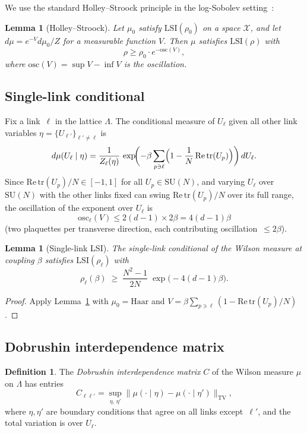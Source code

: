 \documentclass[11pt]{article}
\newtheorem{lemma}[theorem]{Lemma}
\theoremstyle{definition}
\newtheorem{definition}[theorem]{Definition}
\theoremstyle{remark}
\newcommand{\SU}{\mathrm{SU}}
\newcommand{\tr}{\mathrm{tr}}
\newcommand{\osc}{\mathrm{osc}}
\newcommand{\LSI}{\mathrm{LSI}}
\newcommand{\TV}{\mathrm{TV}}
\newcommand{\Haar}{\mathrm{Haar}}
\begin{document}
We use the standard Holley--Stroock principle in the log-Sobolev 
setting~\cite[Prop.~5.1.6]{BGL}:

\begin{lemma}[Holley--Stroock]\label{lem:HS}
Let $\mu_0$ satisfy $\LSI(\rho_0)$ on a space $\mathcal{X}$, and 
let $d\mu = e^{-V} d\mu_0 / Z$ for a measurable function $V$.  Then 
$\mu$ satisfies $\LSI(\rho)$ with
\[
  \rho \geq \rho_0 \cdot e^{-\osc(V)},
\]
where $\osc(V) = \sup V - \inf V$ is the oscillation.
\end{lemma}

\subsection{Single-link conditional}

Fix a link~$\ell$ in the lattice $\Lambda$.  The conditional 
measure of $U_\ell$ given all other link variables 
$\eta = \{U_{\ell'}\}_{\ell' \neq \ell}$ is
\[
  d\mu(U_\ell \mid \eta) = 
  \frac{1}{Z_\ell(\eta)}\,
  \exp\!\biggl(-\beta \sum_{p \ni \ell}
  \Bigl(1 - \frac{1}{N}\,\mathrm{Re}\,\tr(U_p)\Bigr)\biggr)
  \,dU_\ell.
\]
Since $\mathrm{Re}\,\tr(U_p)/N \in [-1, 1]$ for all 
$U_p \in \SU(N)$, and varying $U_\ell$ over $\SU(N)$ with the 
other links fixed can swing $\mathrm{Re}\,\tr(U_p)/N$ over its 
full range, the oscillation of the exponent over $U_\ell$ is
\[
  \osc_\ell(V) \leq 2(d-1) \times 2\beta = 4(d-1)\beta
\]
(two plaquettes per transverse direction, each contributing 
oscillation~$\leq 2\beta$).

\begin{lemma}[Single-link LSI]\label{lem:single_link}
The single-link conditional of the Wilson measure at coupling 
$\beta$ satisfies $\LSI(\rho_\ell)$ with
\begin{equation}\label{eq:rho_ell}
  \rho_\ell(\beta) \;\geq\; 
  \frac{N^2-1}{2N}\;\exp\!\bigl(-4(d-1)\beta\bigr).
\end{equation}
\end{lemma}

\begin{proof}
Apply Lemma~\ref{lem:HS} with $\mu_0 = \Haar$ and 
$V = \beta\sum_{p\ni\ell}(1 - \mathrm{Re}\,\tr(U_p)/N)$.
\end{proof}

\subsection{Dobrushin interdependence matrix}

\begin{definition}
The \emph{Dobrushin interdependence matrix} $C$ of the Wilson 
measure $\mu$ on $\Lambda$ has entries
\[
  C_{\ell\ell'} = \sup_{\eta,\,\eta'} 
  \bigl\|\mu(\cdot \mid \eta) - \mu(\cdot \mid \eta')\bigr\|_{\TV},
\]
where $\eta, \eta'$ are boundary conditions that agree on all 
links except~$\ell'$, and the total variation is over $U_\ell$.
\end{definition}
\end{document}
